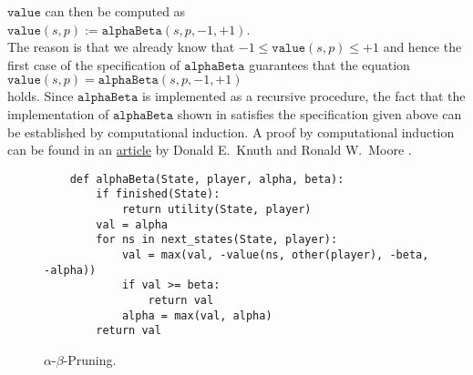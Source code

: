 $\texttt{value}$ can then be computed as 
\\[0.2cm]
\hspace*{1.3cm}
$\texttt{value}(s, p ) := \texttt{alphaBeta}(s, p, -1, +1)$.
\\[0.2cm]
The reason is that we already know that $-1 \leq \texttt{value}(s,p) \leq +1$ and hence the first case of the
specification of $\texttt{alphaBeta}$ guarantees that the equation
\\[0.2cm]
\hspace*{1.3cm}
$\texttt{value}(s,p) = \texttt{alphaBeta}(s,p,-1,+1)$
\\[0.2cm]
holds.  Since $\texttt{alphaBeta}$ is implemented as a recursive procedure, 
the fact that the implementation of $\texttt{alphaBeta}$ shown in  satisfies the
specification given above can be established by computational induction.  A proof by computational induction
can be found in an
\href{https://pdfs.semanticscholar.org/dce2/6118156e5bc287bca2465a62e75af39c7e85.pdf}{article} by Donald
E.~Knuth and Ronald W.~Moore \cite{knuth:1975}. 



\begin{figure}[!ht]
\centering
\begin{verbatim}
    def alphaBeta(State, player, alpha, beta):
        if finished(State):
            return utility(State, player)
        val = alpha
        for ns in next_states(State, player):
            val = max(val, -value(ns, other(player), -beta, -alpha))
            if val >= beta:
                return val
            alpha = max(val, alpha)
        return val
\end{verbatim}
\vspace*{-1.0cm}
\caption{$\alpha$-$\beta$-Pruning.}
\label{fig:Alpha-Beta-Pruning.ipynb:alphaBeta}
\end{figure}


